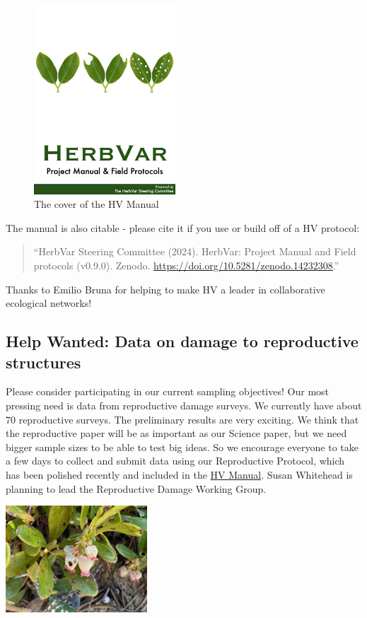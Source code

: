 \documentclass[
  12pt,
]{article}
\begin{document}
\begin{figure}
\centering
\includegraphics[width=2.08333in,height=\textheight]{images_2025-01/HV_manual_cover.png}
\caption{The cover of the HV Manual}
\end{figure}

The manual is also citable - please cite it if you use or build off of a
HV protocol:

\begin{quote}
``HerbVar Steering Committee (2024). HerbVar: Project Manual and Field
protocols (v0.9.0). Zenodo.
\url{https://doi.org/10.5281/zenodo.14232308}.''
\end{quote}

Thanks to Emilio Bruna for helping to make HV a leader in collaborative
ecological networks!

\subsection{Help Wanted: Data on damage to reproductive
structures}\label{help}

Please consider participating in our current sampling objectives! Our
most pressing need is data from reproductive damage surveys. We
currently have about 70 reproductive surveys. The preliminary results
are very exciting. We think that the reproductive paper will be as
important as our Science paper, but we need bigger sample sizes to be
able to test big ideas. So we encourage everyone to take a few days to
collect and submit data using our Reproductive Protocol, which has been
polished recently and included in the
\href{https://herbvar-network.github.io/herbvar_manual/protocols/repro_damage.html}{HV
Manual}. Susan Whitehead is planning to lead the Reproductive Damage
Working Group.

\includegraphics[width=2.08333in,height=\textheight]{images_2025-01/IMG_3986.jpeg}
\end{document}
